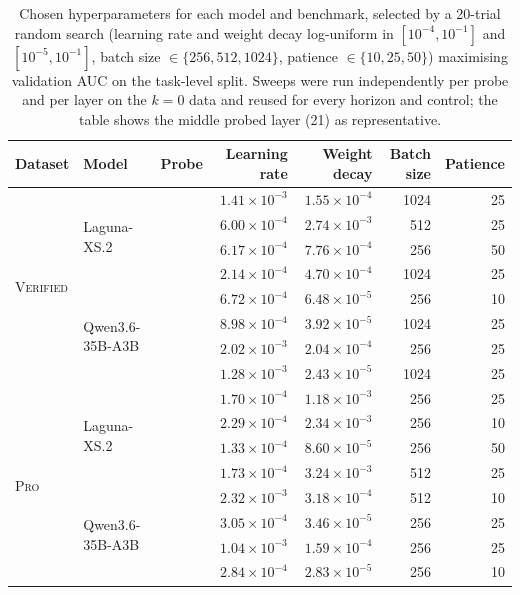 \begin{table}[t]
\centering
\caption{Chosen hyperparameters for each model and benchmark, selected by a 20-trial random search (learning rate and weight decay log-uniform in $[10^{-4}, 10^{-1}]$ and $[10^{-5}, 10^{-1}]$, batch size $\in \{256, 512, 1024\}$, patience $\in \{10, 25, 50\}$) maximising validation AUC on the task-level split. Sweeps were run independently per probe and per layer on the $k{=}0$ data and reused for every horizon and control; the table shows the middle probed layer (21) as representative.}
\label{tab:probe-hparams}
\begin{tabular}{lllrrrr}
\toprule
Dataset & Model & Probe & Learning rate & Weight decay & Batch size & Patience \\
\midrule
\multirow{8}{*}{\textsc{Verified}} & \multirow{4}{*}{Laguna-XS.2} & \Syntactic{} & $1.41 \times 10^{-3}$ & $1.55 \times 10^{-4}$ & 1024 & 25 \\
 &  & \Semantic{} & $6.00 \times 10^{-4}$ & $2.74 \times 10^{-3}$ & 512 & 25 \\
 &  & \Regressions{} & $6.17 \times 10^{-4}$ & $7.76 \times 10^{-4}$ & 256 & 50 \\
 &  & \RedFail{} & $2.14 \times 10^{-4}$ & $4.70 \times 10^{-4}$ & 1024 & 25 \\
 & \multirow{4}{*}{Qwen3.6-35B-A3B} & \Syntactic{} & $6.72 \times 10^{-4}$ & $6.48 \times 10^{-5}$ & 256 & 10 \\
 &  & \Semantic{} & $8.98 \times 10^{-4}$ & $3.92 \times 10^{-5}$ & 1024 & 25 \\
 &  & \Regressions{} & $2.02 \times 10^{-3}$ & $2.04 \times 10^{-4}$ & 256 & 25 \\
 &  & \RedFail{} & $1.28 \times 10^{-3}$ & $2.43 \times 10^{-5}$ & 1024 & 25 \\
\midrule
\multirow{8}{*}{\textsc{Pro}} & \multirow{4}{*}{Laguna-XS.2} & \Syntactic{} & $1.70 \times 10^{-4}$ & $1.18 \times 10^{-3}$ & 256 & 25 \\
 &  & \Semantic{} & $2.29 \times 10^{-4}$ & $2.34 \times 10^{-3}$ & 256 & 10 \\
 &  & \Regressions{} & $1.33 \times 10^{-4}$ & $8.60 \times 10^{-5}$ & 256 & 50 \\
 &  & \RedFail{} & $1.73 \times 10^{-4}$ & $3.24 \times 10^{-3}$ & 512 & 25 \\
 & \multirow{4}{*}{Qwen3.6-35B-A3B} & \Syntactic{} & $2.32 \times 10^{-3}$ & $3.18 \times 10^{-4}$ & 512 & 10 \\
 &  & \Semantic{} & $3.05 \times 10^{-4}$ & $3.46 \times 10^{-5}$ & 256 & 25 \\
 &  & \Regressions{} & $1.04 \times 10^{-3}$ & $1.59 \times 10^{-4}$ & 256 & 25 \\
 &  & \RedFail{} & $2.84 \times 10^{-4}$ & $2.83 \times 10^{-5}$ & 256 & 10 \\
\bottomrule
\end{tabular}
\end{table}
